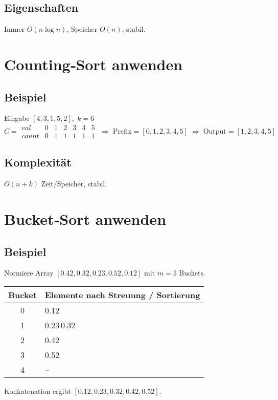 \subsection*{Eigenschaften}
Immer $O(n\log n)$, Speicher $O(n)$, stabil.

\section{Counting‑Sort anwenden}
\subsection*{Beispiel}
Eingabe \([4,3,1,5,2] ,\;k=6\)
\[
C=\begin{array}{c|cccccc}
val&0&1&2&3&4&5\\\hline
count&0&1&1&1&1&1\end{array}
\;
\Rightarrow\;\text{Prefix}=[0,1,2,3,4,5]\;
\Rightarrow\;\text{Output}=[1,2,3,4,5]
\]

\subsection*{Komplexität}
$O(n+k)$ Zeit/Speicher, stabil.

\section{Bucket‑Sort anwenden}
\subsection*{Beispiel}
Normiere Array \([0.42,0.32,0.23,0.52,0.12]\) mit $m=5$ Buckets.
\begin{center}
\begin{tabular}{c|l}
Bucket & Elemente nach Streuung / Sortierung\\\hline
0 & 0.12\\
1 & 0.23\,0.32\\
2 & 0.42\\
3 & 0.52\\
4 & –
\end{tabular}
\end{center}
Konkatenation ergibt \([0.12,0.23,0.32,0.42,0.52]\).

